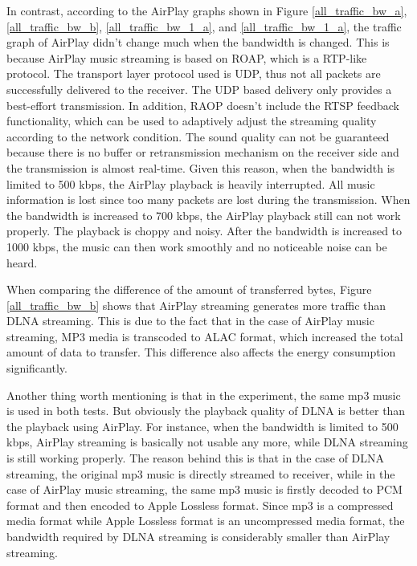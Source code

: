 In contrast, according to the AirPlay graphs shown in Figure
\ref{all_traffic_bw_a}, \ref{all_traffic_bw_b}, \ref{all_traffic_bw_1_a}, and
\ref{all_traffic_bw_1_a}, the traffic graph of AirPlay didn't change much
when the bandwidth is changed. This is because AirPlay music streaming is based
on ROAP, which is a RTP-like protocol. The transport layer protocol used is
UDP, thus not all packets are successfully delivered to the receiver. The UDP
based delivery only provides a best-effort transmission. In addition, RAOP
doesn't include the RTSP feedback functionality, which can be used to adaptively
adjust the streaming quality according to the network condition. The sound quality can not be
guaranteed because there is no buffer or retransmission mechanism on the
receiver side and the transmission is almost real-time. Given this reason, when
the bandwidth is limited to 500 kbps, the AirPlay playback is heavily
interrupted. All music information is lost since too many packets are lost
during the transmission. When the bandwidth is increased to 700 kbps, the
AirPlay playback still can not work properly. The playback is choppy and noisy.
After the bandwidth is increased to 1000 kbps, the music can then work smoothly
and no noticeable noise can be heard.

When comparing the difference of the amount of transferred bytes, Figure
\ref{all_traffic_bw_b} shows that AirPlay streaming generates more traffic than
DLNA streaming. This is due to the fact that in the case of AirPlay music
streaming, MP3 media is transcoded to ALAC format, which increased the
total amount of data to transfer. This difference also affects the energy
consumption significantly.

Another thing worth mentioning is that in the experiment, the same mp3 music is
used in both tests. But obviously the playback quality of DLNA is better than
the playback using AirPlay. For instance, when the bandwidth is limited to 500
kbps, AirPlay streaming is basically not usable any more, while DLNA streaming
is still working properly. The reason behind this is that in the case of DLNA
streaming, the original mp3 music is directly streamed to receiver, while in
the case of AirPlay music streaming, the same mp3 music is firstly decoded to
PCM format and then encoded to Apple Lossless format. Since mp3 is a compressed
media format while Apple Lossless format is an uncompressed media format, the
bandwidth required by DLNA streaming is considerably smaller than AirPlay
streaming.

